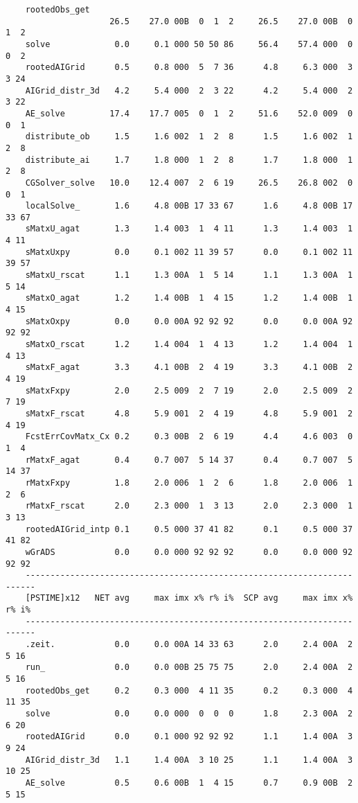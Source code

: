 \begin{verbatim}
    rootedObs_get
                     26.5    27.0 00B  0  1  2     26.5    27.0 00B  0  1  2
    solve             0.0     0.1 000 50 50 86     56.4    57.4 000  0  0  2
    rootedAIGrid      0.5     0.8 000  5  7 36      4.8     6.3 000  3  3 24
    AIGrid_distr_3d   4.2     5.4 000  2  3 22      4.2     5.4 000  2  3 22
    AE_solve         17.4    17.7 005  0  1  2     51.6    52.0 009  0  0  1
    distribute_ob     1.5     1.6 002  1  2  8      1.5     1.6 002  1  2  8
    distribute_ai     1.7     1.8 000  1  2  8      1.7     1.8 000  1  2  8
    CGSolver_solve   10.0    12.4 007  2  6 19     26.5    26.8 002  0  0  1
    localSolve_       1.6     4.8 00B 17 33 67      1.6     4.8 00B 17 33 67
    sMatxU_agat       1.3     1.4 003  1  4 11      1.3     1.4 003  1  4 11
    sMatxUxpy         0.0     0.1 002 11 39 57      0.0     0.1 002 11 39 57
    sMatxU_rscat      1.1     1.3 00A  1  5 14      1.1     1.3 00A  1  5 14
    sMatxO_agat       1.2     1.4 00B  1  4 15      1.2     1.4 00B  1  4 15
    sMatxOxpy         0.0     0.0 00A 92 92 92      0.0     0.0 00A 92 92 92
    sMatxO_rscat      1.2     1.4 004  1  4 13      1.2     1.4 004  1  4 13
    sMatxF_agat       3.3     4.1 00B  2  4 19      3.3     4.1 00B  2  4 19
    sMatxFxpy         2.0     2.5 009  2  7 19      2.0     2.5 009  2  7 19
    sMatxF_rscat      4.8     5.9 001  2  4 19      4.8     5.9 001  2  4 19
    FcstErrCovMatx_Cx 0.2     0.3 00B  2  6 19      4.4     4.6 003  0  1  4
    rMatxF_agat       0.4     0.7 007  5 14 37      0.4     0.7 007  5 14 37
    rMatxFxpy         1.8     2.0 006  1  2  6      1.8     2.0 006  1  2  6
    rMatxF_rscat      2.0     2.3 000  1  3 13      2.0     2.3 000  1  3 13
    rootedAIGrid_intp 0.1     0.5 000 37 41 82      0.1     0.5 000 37 41 82
    wGrADS            0.0     0.0 000 92 92 92      0.0     0.0 000 92 92 92
    ------------------------------------------------------------------------
    [PSTIME]x12   NET avg     max imx x% r% i%  SCP avg     max imx x% r% i%
    ------------------------------------------------------------------------
    .zeit.            0.0     0.0 00A 14 33 63      2.0     2.4 00A  2  5 16
    run_              0.0     0.0 00B 25 75 75      2.0     2.4 00A  2  5 16
    rootedObs_get     0.2     0.3 000  4 11 35      0.2     0.3 000  4 11 35
    solve             0.0     0.0 000  0  0  0      1.8     2.3 00A  2  6 20
    rootedAIGrid      0.0     0.1 000 92 92 92      1.1     1.4 00A  3  9 24
    AIGrid_distr_3d   1.1     1.4 00A  3 10 25      1.1     1.4 00A  3 10 25
    AE_solve          0.5     0.6 00B  1  4 15      0.7     0.9 00B  2  5 15

\end{verbatim}
